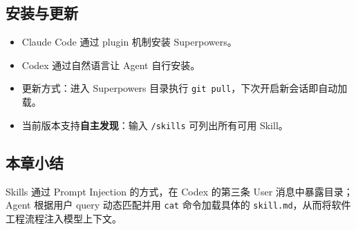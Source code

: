 \subsection{安装与更新}

\begin{itemize}
    \item Claude Code 通过 plugin 机制安装 Superpowers。
    \item Codex 通过自然语言让 Agent 自行安装。
    \item 更新方式：进入 Superpowers 目录执行 \texttt{git pull}，下次开启新会话即自动加载。
    \item 当前版本支持\textbf{自主发现}：输入 \texttt{/skills} 可列出所有可用 Skill。
\end{itemize}

\subsection{本章小结}

Skills 通过 Prompt Injection 的方式，在 Codex 的第三条 User 消息中暴露目录；Agent 根据用户 query 动态匹配并用 \texttt{cat} 命令加载具体的 \texttt{skill.md}，从而将软件工程流程注入模型上下文。


